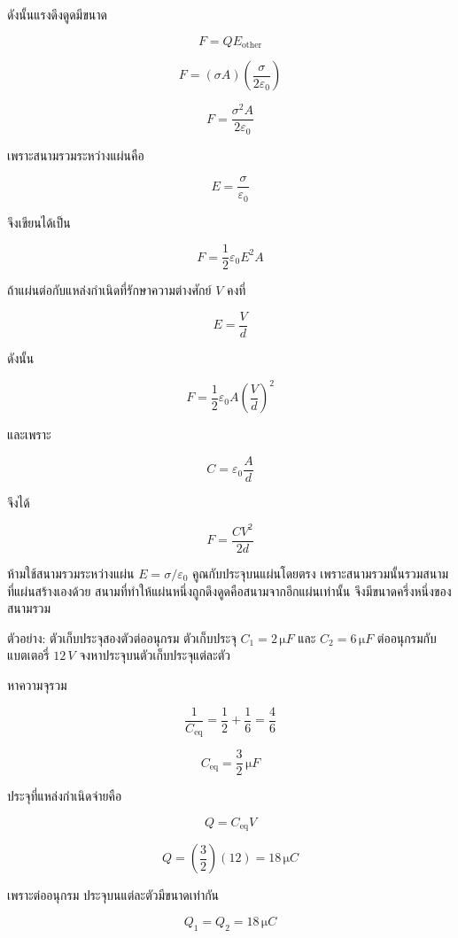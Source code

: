 ดังนั้นแรงดึงดูดมีขนาด

\[
F=QE_{\text{other}}
\]

\[
F=(\sigma A)\left(\frac{\sigma}{2\varepsilon_0}\right)
\]

\[
\boxed{F=\frac{\sigma^2A}{2\varepsilon_0}}
\]

เพราะสนามรวมระหว่างแผ่นคือ

\[
E=\frac{\sigma}{\varepsilon_0}
\]

จึงเขียนได้เป็น

\[
\boxed{F=\frac{1}{2}\varepsilon_0E^2A}
\]

ถ้าแผ่นต่อกับแหล่งกำเนิดที่รักษาความต่างศักย์ $V$ คงที่

\[
E=\frac{V}{d}
\]

ดังนั้น

\[
F
=
\frac{1}{2}\varepsilon_0A\left(\frac{V}{d}\right)^2
\]

และเพราะ

\[
C=\varepsilon_0\frac{A}{d}
\]

จึงได้

\[
\boxed{F=\frac{CV^2}{2d}}
\]

\begin{tcolorbox}[title=เหตุผลของตัวประกอบ $1/2$]
ห้ามใช้สนามรวมระหว่างแผ่น $E=\sigma/\varepsilon_0$ คูณกับประจุบนแผ่นโดยตรง เพราะสนามรวมนั้นรวมสนามที่แผ่นสร้างเองด้วย สนามที่ทำให้แผ่นหนึ่งถูกดึงดูดคือสนามจากอีกแผ่นเท่านั้น จึงมีขนาดครึ่งหนึ่งของสนามรวม
\end{tcolorbox}

\begin{examplebox}{ตัวอย่าง: ตัวเก็บประจุสองตัวต่ออนุกรม}
ตัวเก็บประจุ $C_1=2\,\si{\micro F}$ และ $C_2=6\,\si{\micro F}$ ต่ออนุกรมกับแบตเตอรี่ $12\,\si{V}$ จงหาประจุบนตัวเก็บประจุแต่ละตัว

หาความจุรวม

\[
\frac{1}{C_{\text{eq}}}
=
\frac{1}{2}+\frac{1}{6}
=
\frac{4}{6}
\]

\[
C_{\text{eq}}=\frac{3}{2}\,\si{\micro F}
\]

ประจุที่แหล่งกำเนิดจ่ายคือ

\[
Q=C_{\text{eq}}V
\]

\[
Q=\left(\frac{3}{2}\right)(12)
=18\,\si{\micro C}
\]

เพราะต่ออนุกรม ประจุบนแต่ละตัวมีขนาดเท่ากัน

\[
\boxed{Q_1=Q_2=18\,\si{\micro C}}
\]
\end{examplebox}

